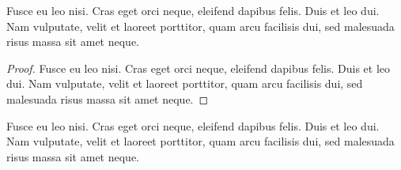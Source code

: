 \documentclass[a4paper,UKenglish,cleveref, autoref, thm-restate]{lipics-v2021}
\begin{document}
\begin{claim*}\label{testenv-claim2}
Fusce eu leo nisi. Cras eget orci neque, eleifend dapibus felis. Duis et leo dui. Nam vulputate, velit et laoreet porttitor, quam arcu facilisis dui, sed malesuada risus massa sit amet neque.
\end{claim*}

\begin{proof}
Fusce eu leo nisi. Cras eget orci neque, eleifend dapibus felis. Duis et leo dui. Nam vulputate, velit et laoreet porttitor, quam arcu facilisis dui, sed malesuada risus massa sit amet neque.
\end{proof}

\begin{claimproof}
Fusce eu leo nisi. Cras eget orci neque, eleifend dapibus felis. Duis et leo dui. Nam vulputate, velit et laoreet porttitor, quam arcu facilisis dui, sed malesuada risus massa sit amet neque.
\end{claimproof}
\end{document}
